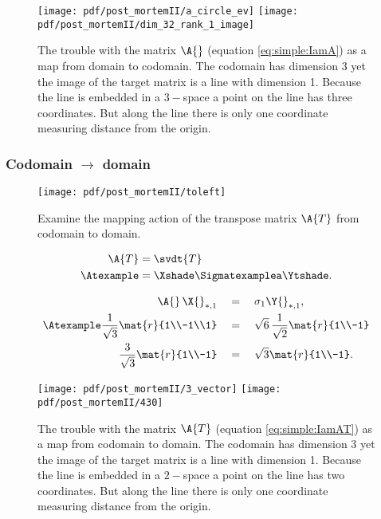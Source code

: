 \begin{figure}[htbp] %
   \centering
   \texttt{[image: pdf/post\_mortemII/a\_circle\_ev]} \qquad
   \texttt{[image: pdf/post\_mortemII/dim\_32\_rank\_1\_image]} 
   \caption[The line is embedded in a $3-$space]{The trouble with the matrix $\A{}$ (equation \eqref{eq:simple:IamA}) as a map from domain to codomain. The codomain has dimension 3 yet the image of the target matrix is a line with dimension 1. Because the line is embedded in a $3-$space a point on the line has three coordinates. But along the line there is only one coordinate measuring distance from the origin.}
   \label{fig:toright}
\end{figure}

\subsubsection{Codomain $\longrightarrow$ domain}
\begin{figure}[htbp] %
   \centering
   \texttt{[image: pdf/post\_mortemII/toleft]} 
   \caption{Examine the mapping action of the transpose matrix $\A{T}$ from codomain to domain.}
   \label{fig:toright}
\end{figure}
\begin{equation}
  \begin{split}
    \A{T} &= \svdt{T} \\
    \Atexample &= \Xshade \Sigmatexamplea \Ytshade.
  \end{split}
  \label{eq:simple:IamAT}
\end{equation}

\begin{equation}
  \begin{split}
    \A{}\,\X{}_{*,1}\quad &= \quad \sigma_{1}\Y{}_{*,1}, \\
    \Atexample \frac{1}{\sqrt{3}}\mat{r}{1\\-1\\1} \quad & =  \quad \sqrt{6}\,\frac{1}{\sqrt{2}}\mat{r}{1\\-1}\\
    \frac{3}{\sqrt{3}}\mat{r}{1\\-1}  \quad & =  \quad \sqrt{3}\mat{r}{1\\-1}.
  \end{split}
\end{equation}

\begin{figure}[htbp] %
   \centering
   \texttt{[image: pdf/post\_mortemII/3\_vector]}  \qquad
   \texttt{[image: pdf/post\_mortemII/430]}
   \caption[The line is embedded in a $2-$space]{The trouble with the matrix $\A{T}$ (equation \eqref{eq:simple:IamAT}) as a map from codomain to domain. The codomain has dimension 3 yet the image of the target matrix is a line with dimension 1. Because the line is embedded in a $2-$space a point on the line has two coordinates. But along the line there is only one coordinate measuring distance from the origin.}
   \label{fig:toleft}
\end{figure}


\endinput